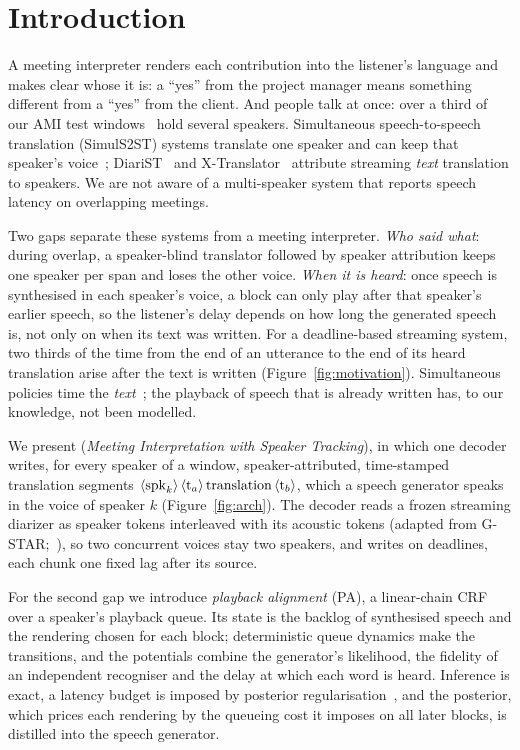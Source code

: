 \section{Introduction}
\label{sec:intro}



A meeting interpreter renders each contribution into the listener's language and makes clear whose it is: a
``yes'' from the project manager means something different from a ``yes'' from the client. And people talk at once:
over a third of our AMI test windows~\citep{carletta2005ami} hold several speakers. Simultaneous speech-to-speech
translation (SimulS2ST) systems translate one speaker and can keep that speaker's
voice~\citep{seamless2023,labiausse2025hibiki,cheng2025liveinterpret,deng2025simuls2s};
DiariST~\citep{yang2024diarist} and X-Translator~\citep{zhao2026xtranslator} attribute streaming \emph{text}
translation to speakers. We are not aware of a multi-speaker system that reports speech latency on overlapping
meetings.

Two gaps separate these systems from a meeting interpreter. \emph{Who said what}: during overlap, a speaker-blind
translator followed by speaker attribution keeps one speaker per span and loses the other voice. \emph{When it is
heard}: once speech is synthesised in each speaker's voice, a block can only play after that speaker's earlier speech,
so the listener's delay depends on how long the generated speech is, not only on when its text was written. For a
deadline-based streaming system, two thirds of the time from the end of an utterance to the end of its heard translation
arise after the text is written (Figure~\ref{fig:motivation}). Simultaneous policies time the
\emph{text}~\citep{ma2019stacl,arivazhagan2019milk,zhang2023hmt}; the playback of speech that is already written
has, to our knowledge, not been modelled.

We present \sys{} (\emph{Meeting Interpretation with Speaker Tracking}), in which one decoder writes, for every speaker
of a window, speaker-attributed, time-stamped translation segments $\langle\mathrm{spk}_{k}\rangle\,\langle\mathrm{t}_{a}\rangle\,\text{translation}\,\langle\mathrm{t}_{b}\rangle$,
which a speech generator speaks in the voice of speaker $k$ (Figure~\ref{fig:arch}). The decoder reads a frozen
streaming diarizer as speaker tokens interleaved with its acoustic tokens (adapted from G-STAR;~\citealp{peng2026gstar}),
so two concurrent voices stay two speakers, and writes on deadlines, each chunk one fixed lag after its source.

For the second gap we introduce \emph{playback alignment} (PA), a linear-chain CRF over a speaker's playback queue. Its
state is the backlog of synthesised speech and the rendering chosen for each block; deterministic queue dynamics make
the transitions, and the potentials combine the generator's likelihood, the fidelity of an independent recogniser and
the delay at which each word is heard. Inference is exact, a latency budget is imposed by posterior
regularisation~\citep{ganchev2010posterior}, and the posterior, which prices each rendering by the queueing cost it
imposes on all later blocks, is distilled into the speech generator.

